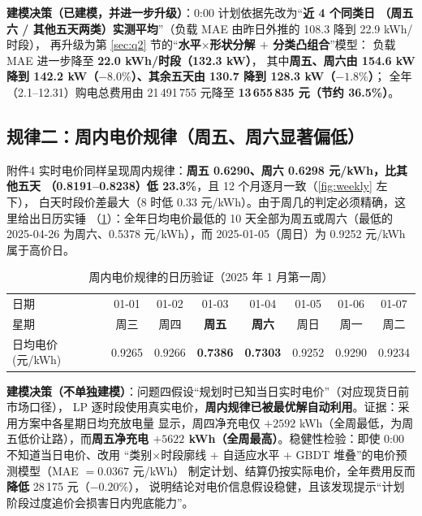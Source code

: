 \textbf{建模决策（已建模，并进一步升级）}：0:00 计划依据先改为“\textbf{近 4 个同类日
（周五六 / 其他五天两类）实测平均}”（负载 MAE 由昨日外推的 108.3 降到 22.9 kWh/时段），
再升级为第 \ref{sec:q2} 节的“\textbf{水平$\times$形状分解 $+$ 分类凸组合}”模型：
负载 MAE 进一步降至 \textbf{22.0 kWh/时段（132.3 kW）}，
其中\textbf{周五、周六由 154.6 kW 降到 142.2 kW（$-8.0\%$）、其余五天由 130.7 降到 128.3 kW（$-1.8\%$）}；
全年（2.1--12.31）购电总费用由 21\,491\,755 元降至 \textbf{13\,655\,835 元（节约 36.5\%）}。

\subsection{规律二：周内电价规律（周五、周六显著偏低）}

附件4 实时电价同样呈现周内规律：\textbf{周五 0.6290、周六 0.6298 元/kWh，比其他五天
（0.8191--0.8238）低 23.3\%}，且 12 个月逐月一致（\cref{fig:weekly} 左下），
白天时段价差最大（8 时低 0.33 元/kWh）。由于周几的判定必须精确，这里给出日历实锤
（\cref{tab:calendar}）：全年日均电价最低的 10 天全部为周五或周六（最低的
2025-04-26 为周六、0.5378 元/kWh），而 2025-01-05（周日）为 0.9252 元/kWh 属于高价日。

\begin{table}[htbp]
\centering
\caption{周内电价规律的日历验证（2025 年 1 月第一周）}
\label{tab:calendar}
\small
\begin{tabular}{@{}lccccccc@{}}
\toprule
日期 & 01-01 & 01-02 & 01-03 & 01-04 & 01-05 & 01-06 & 01-07 \\
星期 & 周三 & 周四 & \textbf{周五} & \textbf{周六} & 周日 & 周一 & 周二 \\
日均电价(元/kWh) & 0.9265 & 0.9266 & \textbf{0.7386} & \textbf{0.7303} & 0.9252 & 0.9290 & 0.9234 \\
\bottomrule
\end{tabular}
\end{table}

\textbf{建模决策（不单独建模）}：问题四假设“规划时已知当日实时电价”（对应现货日前市场口径），
LP 逐时段使用真实电价，\textbf{周内规律已被最优解自动利用}。证据：采用方案中各星期日均充放电量
显示，周四净充电仅 $+2592$ kWh（全周最低，为周五低价让路），而\textbf{周五净充电
$+5622$ kWh（全周最高）}。稳健性检验：即使 0:00 不知道当日电价、改用
“类别$\times$时段廓线 + 自适应水平 + GBDT 堆叠”的电价预测模型（MAE $=0.0367$ 元/kWh）
制定计划、结算仍按实际电价，全年费用反而\textbf{降低} 28\,175 元（$-0.20\text{\%}$），
说明结论对电价信息假设稳健，且该发现提示“计划阶段过度追价会损害日内兜底能力”。

